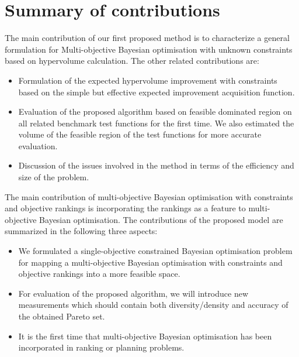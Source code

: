 \section{Summary of contributions}
The main contribution of our first proposed method is to characterize a general formulation for Multi-objective Bayesian optimisation with unknown constraints based on hypervolume calculation. The other related contributions are:
\begin{itemize}
\item Formulation of the expected hypervolume improvement with constraints based on the simple but effective expected improvement acquisition function.
\item Evaluation of the proposed algorithm based on feasible dominated region on all related benchmark test functions for the first time. We also estimated the volume of the feasible region of the test functions for more accurate evaluation.
\item Discussion of the issues involved in the method in terms of the efficiency and size of the problem.
\end{itemize}
The main contribution of multi-objective Bayesian optimisation with constraints and objective rankings is incorporating the rankings as a feature to multi-objective Bayesian optimisation. The contributions of the proposed model are summarized in the following three aspects:
\begin{itemize}
\item We formulated a single-objective constrained Bayesian optimisation problem for mapping a multi-objective Bayesian optimisation with constraints and 
objective rankings into a more feasible space.
\item For evaluation of the proposed algorithm, we will introduce new measurements which should contain both diversity/density and accuracy of the obtained Pareto set.
\item It is the first time that multi-objective Bayesian optimisation has been incorporated in ranking or planning problems.
\end{itemize}
